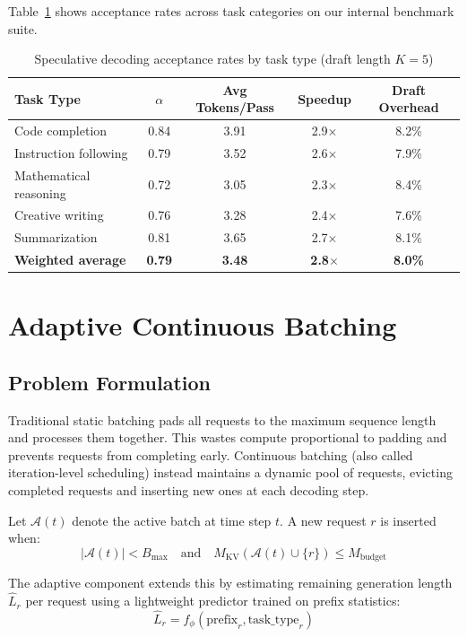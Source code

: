 \documentclass[11pt,a4paper]{article}
\begin{document}
Table~\ref{tab:speculative_acceptance} shows acceptance rates across task categories on our internal benchmark suite.

\begin{table}[H]
\centering
\caption{Speculative decoding acceptance rates by task type (draft length $K=5$)}
\label{tab:speculative_acceptance}
\begin{tabular}{lcccc}
\toprule
Task Type & $\alpha$ & Avg Tokens/Pass & Speedup & Draft Overhead \\
\midrule
Code completion & 0.84 & 3.91 & 2.9$\times$ & 8.2\% \\
Instruction following & 0.79 & 3.52 & 2.6$\times$ & 7.9\% \\
Mathematical reasoning & 0.72 & 3.05 & 2.3$\times$ & 8.4\% \\
Creative writing & 0.76 & 3.28 & 2.4$\times$ & 7.6\% \\
Summarization & 0.81 & 3.65 & 2.7$\times$ & 8.1\% \\
\textbf{Weighted average} & \textbf{0.79} & \textbf{3.48} & \textbf{2.8$\times$} & \textbf{8.0\%} \\
\bottomrule
\end{tabular}
\end{table}

\section{Adaptive Continuous Batching}

\subsection{Problem Formulation}

Traditional static batching pads all requests to the maximum sequence length and processes them together. This wastes compute proportional to padding and prevents requests from completing early. Continuous batching (also called iteration-level scheduling) instead maintains a dynamic pool of requests, evicting completed requests and inserting new ones at each decoding step.

Let $\mathcal{A}(t)$ denote the active batch at time step $t$. A new request $r$ is inserted when:
\begin{equation}
|\mathcal{A}(t)| < B_{\max} \quad \text{and} \quad M_{\text{KV}}(\mathcal{A}(t) \cup \{r\}) \leq M_{\text{budget}}
\end{equation}

The adaptive component extends this by estimating remaining generation length $\hat{L}_r$ per request using a lightweight predictor trained on prefix statistics:
\begin{equation}
\hat{L}_r = f_\phi(\text{prefix}_r, \text{task\_type}_r)
\end{equation}
\end{document}
